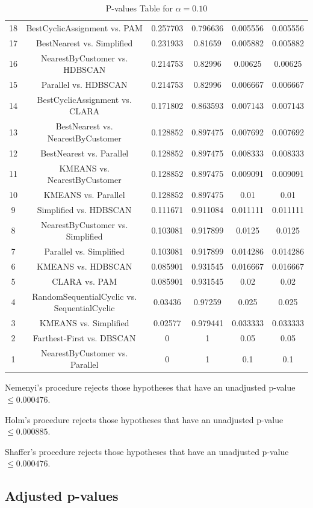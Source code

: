 \documentclass[a4paper,10pt]{article}
\begin{document}
\begin{landscape}
\begin{table}[!htp]
\begin{tabular}{cccccc}
18&BestCyclicAssignment vs. PAM&0.257703&0.796636&0.005556&0.005556\\
17&BestNearest vs. Simplified&0.231933&0.81659&0.005882&0.005882\\
16&NearestByCustomer vs. HDBSCAN&0.214753&0.82996&0.00625&0.00625\\
15&Parallel vs. HDBSCAN&0.214753&0.82996&0.006667&0.006667\\
14&BestCyclicAssignment vs. CLARA&0.171802&0.863593&0.007143&0.007143\\
13&BestNearest vs. NearestByCustomer&0.128852&0.897475&0.007692&0.007692\\
12&BestNearest vs. Parallel&0.128852&0.897475&0.008333&0.008333\\
11&KMEANS vs. NearestByCustomer&0.128852&0.897475&0.009091&0.009091\\
10&KMEANS vs. Parallel&0.128852&0.897475&0.01&0.01\\
9&Simplified vs. HDBSCAN&0.111671&0.911084&0.011111&0.011111\\
8&NearestByCustomer vs. Simplified&0.103081&0.917899&0.0125&0.0125\\
7&Parallel vs. Simplified&0.103081&0.917899&0.014286&0.014286\\
6&KMEANS vs. HDBSCAN&0.085901&0.931545&0.016667&0.016667\\
5&CLARA vs. PAM&0.085901&0.931545&0.02&0.02\\
4&RandomSequentialCyclic vs. SequentialCyclic&0.03436&0.97259&0.025&0.025\\
3&KMEANS vs. Simplified&0.02577&0.979441&0.033333&0.033333\\
2&Farthest-First vs. DBSCAN&0&1&0.05&0.05\\
1&NearestByCustomer vs. Parallel&0&1&0.1&0.1\\
\hline
\end{tabular}
\caption{P-values Table for $\alpha=0.10$}
\end{table}Nemenyi's procedure rejects those hypotheses that have an unadjusted p-value $\le0.000476$.

Holm's procedure rejects those hypotheses that have an unadjusted p-value $\le0.000885$.

Shaffer's procedure rejects those hypotheses that have an unadjusted p-value $\le0.000476$.

\pagebreak

\subsection{Adjusted p-values}


\end{landscape}
\end{document}
